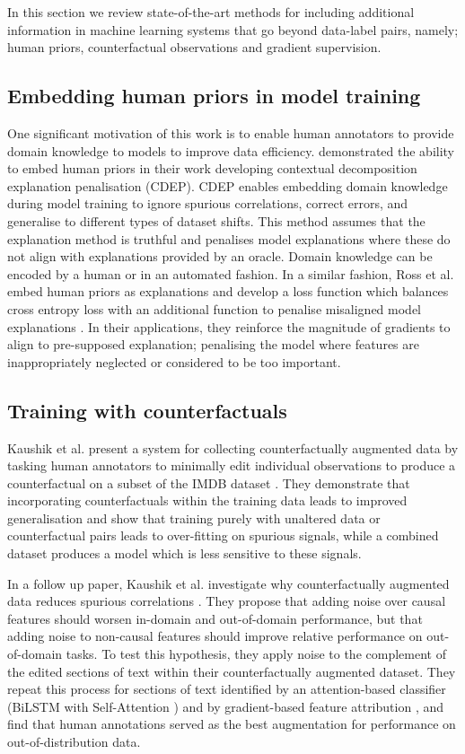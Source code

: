 \documentclass[sigconf,anonymous]{aamas}
\begin{document}
In this section we review state-of-the-art methods for including additional information in machine learning systems that go beyond data-label pairs, namely; human priors, counterfactual observations and gradient supervision.

\subsection{Embedding human priors in model training}
One significant motivation of this work is to enable human annotators to provide domain knowledge to models to improve data efficiency. \citeauthor{rieger2020interpretations} \cite{rieger2020interpretations} demonstrated the ability to embed human priors in their work developing contextual decomposition explanation penalisation (CDEP). CDEP enables embedding domain knowledge during model training to ignore spurious correlations, correct errors, and generalise to different types of dataset shifts. This method assumes that the explanation method is truthful and penalises model explanations where these do not align with explanations provided by an oracle. Domain knowledge can be encoded by a human or in an automated fashion. In a similar fashion, Ross et al. embed human priors as explanations and develop a loss function which balances cross entropy loss with an additional function to penalise misaligned model explanations \cite{ross2017right}. In their applications, they reinforce the magnitude of gradients to align to pre-supposed explanation; penalising the model where features are inappropriately neglected or considered to be too important.

\subsection{Training with counterfactuals}
Kaushik et al. \cite{Kaushik2020Learning} present a system for collecting counterfactually augmented data by tasking human annotators to minimally edit individual observations to produce a counterfactual on a subset of the IMDB dataset \cite{imdb}. They demonstrate that incorporating counterfactuals within the training data leads to improved generalisation and show that training purely with unaltered data or counterfactual pairs leads to over-fitting on spurious signals, while a combined dataset produces a model which is less sensitive to these signals.

In a follow up paper, Kaushik et al. investigate why counterfactually augmented data reduces spurious correlations \cite{kaushik2021explaining}. They propose that adding noise over causal features should worsen in-domain and out-of-domain performance, but that adding noise to non-causal features should improve relative performance on out-of-domain tasks. To test this hypothesis, they apply noise to the complement of the edited sections of text within their counterfactually augmented dataset. They repeat this process for sections of text identified by an attention-based classifier (BiLSTM with Self-Attention \cite{graves2005framewise}) and by gradient-based feature attribution \cite{li2016visualizing}, and find that human annotations served as the best augmentation for performance on out-of-distribution data. 
\end{document}
